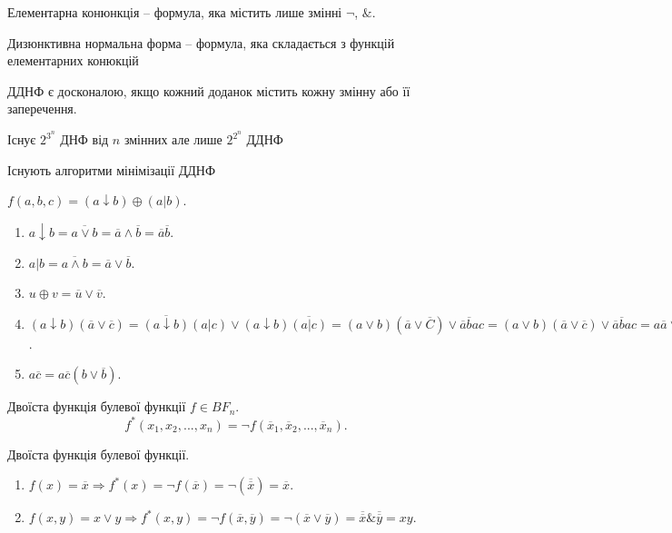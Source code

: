 Елементарна конюнкція -- формула, яка містить лише змінні $\neg$, $\&$.

Дизюнктивна нормальна форма -- формула, яка складається з функцій
елементарних конюкцій



ДДНФ є досконалою, якщо кожний доданок містить кожну змінну або її заперечення.

\begin{lemma}
    Існує $2^{3^n}$ ДНФ від $n$ змінних але лише $2^{2^n}$ ДДНФ
\end{lemma}

Існують алгоритми мінімізації ДДНФ

\begin{example}
    $f(a, b, c) = (a \downarrow b) \oplus (a | b)$.

    \begin{enumerate}
        \item $a \downarrow b = \overline{a \vee b} = \overline{a} \wedge \overline{b} = \overline{a} \overline{b}$.
        \item $a | b = \overline{a \wedge b} = \overline{a} \vee \overline{b}$.
        \item $u \oplus v = \overline{u} \vee \overline{v}$.
        \item $(a \downarrow b) (\overline{a} \vee \overline{c})
            = \overline{(a \downarrow b)} (a | c) \vee (a \downarrow b) \overline{(a | c)}
            = (a \vee b) (\overline{a} \vee \overline{C}) \vee \overline{a}\overline{b} a c
            = (a \vee b) (\overline{a} \vee \overline{c}) \vee \overline{a} \overline{b} a c
            = a \overline{a} \vee a \overline{c} \vee b \overline{a} \vee \overline{b} \overline{c}
            = a \overline{c} \vee \overline{a} b \vee b \overline{c}$.
        \item $a \overline{c} = a \overline{c} (b \vee \overline{b})$.
    \end{enumerate}
\end{example}

\begin{definition}
    Двоїста функція булевої функції $f \in BF_n$.
    \begin{equation}
        f^*(x_1, x_2, ..., x_n) = \neg f(\overline{x}_1, \overline{x}_2, ..., \overline{x}_n).
    \end{equation}
\end{definition}

\begin{example}
    Двоїста функція булевої функції.
    \begin{enumerate}
        \item $f(x) = \overline{x} \Rightarrow f^*(x) = \neg f(\overline{x}) = \neg(\overline{\overline{x}}) = \overline{x}$.
        \item $f(x, y) = x \vee y \Rightarrow f^*(x, y) = \neg f(\overline{x}, \overline{y}) = \neg(\overline{x} \vee \overline{y})
            = \overline{\overline{x}} \& \overline{\overline{y}} = xy$.
    \end{enumerate}
\end{example}

